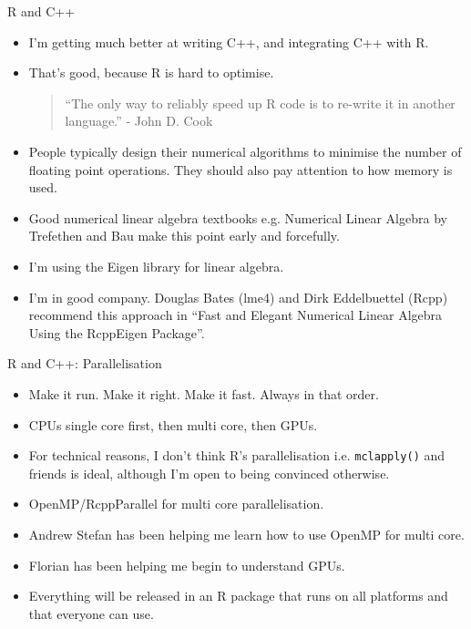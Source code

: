 \documentclass{beamer}
\begin{document}
\begin{frame}{R and C++}
\begin{itemize}
\item I'm getting much better at writing C++, and integrating C++ with R.
\item That's good, because R is hard to optimise.
			\begin{quote}
			``The only way to reliably speed up R code is to re-write it in another language.'' - John D. Cook
			\end{quote}
\item People typically design their numerical algorithms to minimise the number of floating point operations. 
	  	They should also pay attention to how memory is used.
\item Good numerical linear algebra textbooks e.g. Numerical Linear Algebra by Trefethen and Bau make this
			point early and forcefully.
\item I'm using the Eigen library for linear algebra.
\item I'm in good company. Douglas Bates (lme4) and Dirk Eddelbuettel (Rcpp) recommend this approach in
			``Fast and Elegant Numerical Linear Algebra Using the RcppEigen Package''.
\end{itemize}
\end{frame}

\begin{frame}{R and C++: Parallelisation}
\begin{itemize}
\item Make it run. Make it right. Make it fast. Always in that order.
\item CPUs single core first, then multi core, then GPUs.
\item For technical reasons, I don't think R's parallelisation i.e. \texttt{mclapply()} and friends is ideal,
			although I'm open to being convinced otherwise.
\item OpenMP/RcppParallel for multi core parallelisation.
\item Andrew Stefan has been helping me learn how to use OpenMP for multi core.
\item Florian has been helping me begin to understand GPUs.
\item Everything will be released in an R package that runs on all platforms and that everyone can use.
\end{itemize}
\end{frame}
\end{document}
